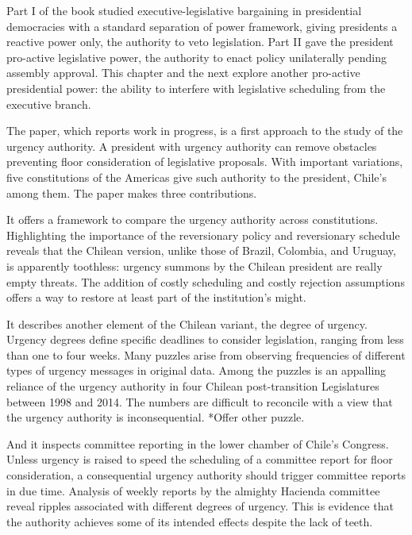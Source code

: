 \documentclass[letter,12pt]{article}
\begin{document}
\onehalfspacing

\noindent Part I of the book studied executive-legislative bargaining in presidential democracies with a standard separation of power framework, giving presidents a reactive power only, the authority to veto legislation. Part II gave the president pro-active legislative power, the authority to enact policy unilaterally pending assembly approval. This chapter and the next explore another pro-active presidential power: the ability to interfere with legislative scheduling from the executive branch. 

The paper, which reports work in progress, is a first approach to the study of the urgency authority. A president with urgency authority can remove obstacles preventing floor consideration of legislative proposals. With important variations, five constitutions of the Americas give such authority to the president, Chile's among them. The paper makes three contributions. 

It offers a framework to compare the urgency authority across constitutions. Highlighting the importance of the reversionary policy and reversionary schedule reveals that the Chilean version, unlike those of Brazil, Colombia, and Uruguay, is apparently toothless: urgency summons by the Chilean president are really empty threats. The addition of costly scheduling and costly rejection assumptions offers a way to restore at least part of the institution's might. 

It describes another element of the Chilean variant, the degree of urgency. Urgency degrees define specific deadlines to consider legislation, ranging from less than one to four weeks. Many puzzles arise from observing frequencies of different types of urgency messages in original data. Among the puzzles is an appalling reliance of the urgency authority in four Chilean post-transition Legislatures between 1998 and 2014. The numbers are difficult to reconcile with a view that the urgency authority is inconsequential. *Offer other puzzle. 

And it inspects committee reporting in the lower chamber of Chile's Congress. Unless urgency is raised to speed the scheduling of a committee report for floor consideration, a consequential urgency authority should trigger committee reports in due time. Analysis of weekly reports by the almighty Hacienda committee reveal ripples associated with different degrees of urgency. This is evidence that the authority achieves some of its intended effects despite the lack of teeth.  
\end{document}
